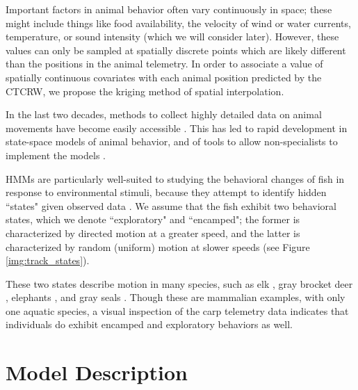 \documentclass[12pt]{article}
\begin{document}
	Important factors in animal behavior often vary continuously in space; these might include things like food availability, the velocity of wind or water currents, temperature, or sound intensity (which we will consider later). However, these values can only be sampled at spatially discrete points which are likely different than the positions in the animal telemetry. In order to associate a value of spatially continuous covariates with each animal position predicted by the CTCRW, we propose the kriging method of spatial interpolation.
	
	In the last two decades, methods to collect highly detailed data on animal movements have become easily accessible \cite{McConnell2010, Tomkiewicz2010}. This has led to rapid development in state-space models of animal behavior, and of tools to allow non-specialists to implement the models \cite{Johnson2008, McClintock2012, Michelot2016, Whoriskey2017, McClintock2018}.
	
	HMMs are particularly well-suited to studying the behavioral changes of fish in response to environmental stimuli, because they attempt to identify hidden ``states" given observed data \cite{Rabiner1989}. We assume that the fish exhibit two behavioral states, which we denote ``exploratory" and ``encamped"; the former is characterized by directed motion at a greater speed, and the latter is characterized by random (uniform) motion at slower speeds (see Figure \ref{img:track_states}).
	
	These two states describe motion in many species, such as elk \cite{Morales2004, Fryxell2008}, gray brocket deer \cite{Grotta-Neto2019}, elephants \cite{Roever2014, Vogel2019}, and gray seals \cite{Breed2009}. Though these are mammalian examples, with only one aquatic species, a visual inspection of the carp telemetry data indicates that individuals do exhibit encamped and exploratory behaviors as well.
	
	\section{Model Description} \label{sec:model-description}
	
	
	
\end{document}
